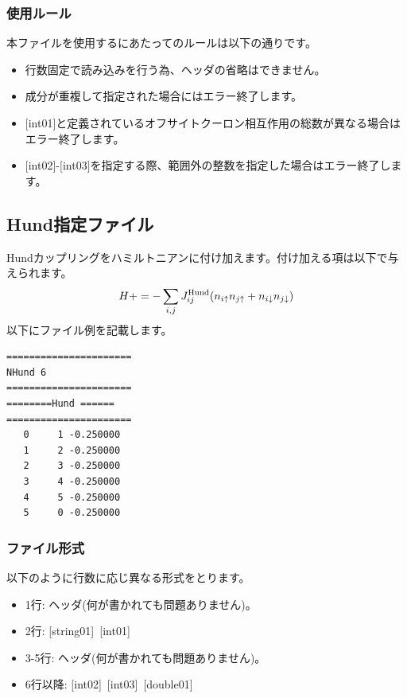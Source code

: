 \subsubsection{使用ルール}
本ファイルを使用するにあたってのルールは以下の通りです。
\begin{itemize}
\item 行数固定で読み込みを行う為、ヘッダの省略はできません。
\item 成分が重複して指定された場合にはエラー終了します。
\item $[$int01$]$と定義されているオフサイトクーロン相互作用の総数が異なる場合はエラー終了します。
\item $[$int02$]$-$[$int03$]$を指定する際、範囲外の整数を指定した場合はエラー終了します。
\end{itemize}

\newpage
\subsection{Hund指定ファイル}
Hundカップリングをハミルトニアンに付け加えます。付け加える項は以下で与えられます。
\begin{equation}
H+=-\sum_{i,j}J_{ij}^{\rm Hund} (n_{i\uparrow}n_{j\uparrow}+n_{i\downarrow}n_{j\downarrow})
\end{equation}
以下にファイル例を記載します。

\begin{minipage}{12.5cm}
\begin{screen}
\begin{verbatim}
====================== 
NHund 6  
====================== 
========Hund ====== 
====================== 
   0     1 -0.250000
   1     2 -0.250000
   2     3 -0.250000
   3     4 -0.250000
   4     5 -0.250000
   5     0 -0.250000
\end{verbatim}
\end{screen}
\end{minipage}

\subsubsection{ファイル形式}
以下のように行数に応じ異なる形式をとります。
 \begin{itemize}
   \item  1行:  ヘッダ(何が書かれても問題ありません)。
   \item  2行:   [string01]~[int01]
   \item  3-5行:  ヘッダ(何が書かれても問題ありません)。
   \item  6行以降:
   [int02]~[int03]~[double01] 
  \end{itemize}
